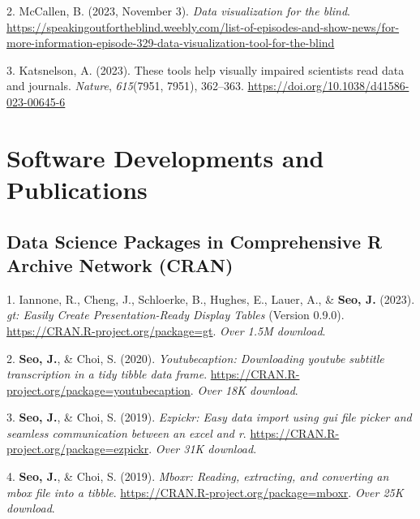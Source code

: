 \documentclass[11pt,a4paper,]{awesome-cv}
\begin{document}
\leavevmode\hypertarget{ref-mccallen2023data}{}%
2. McCallen, B. (2023, November 3). \emph{Data visualization for the
blind}.
\url{https://speakingoutfortheblind.weebly.com/list-of-episodes-and-show-news/for-more-information-episode-329-data-visualization-tool-for-the-blind}

\leavevmode\hypertarget{ref-katsnelsonTheseToolsHelp2023}{}%
3. Katsnelson, A. (2023). These tools help visually impaired scientists
read data and journals. \emph{Nature}, \emph{615}(7951, 7951), 362--363.
\url{https://doi.org/10.1038/d41586-023-00645-6}

\hypertarget{software-developments-and-publications}{%
\section{Software Developments and
Publications}\label{software-developments-and-publications}}

\hypertarget{data-science-packages-in-comprehensive-r-archive-network-cran}{%
\subsection{Data Science Packages in Comprehensive R Archive Network
(CRAN)}\label{data-science-packages-in-comprehensive-r-archive-network-cran}}

\hypertarget{bibliography}{}
\leavevmode\hypertarget{ref-Iannone_gt_Easily_Create}{}%
1. Iannone, R., Cheng, J., Schloerke, B., Hughes, E., Lauer, A., \&
\textbf{Seo, J.} (2023). \emph{gt: Easily Create Presentation-Ready
Display Tables} (Version 0.9.0).
\url{https://CRAN.R-project.org/package=gt}. \emph{Over 1.5M download}.

\leavevmode\hypertarget{ref-R-youtubecaption}{}%
2. \textbf{Seo, J.}, \& Choi, S. (2020). \emph{Youtubecaption:
Downloading youtube subtitle transcription in a tidy tibble data frame}.
\url{https://CRAN.R-project.org/package=youtubecaption}. \emph{Over 18K
download}.

\leavevmode\hypertarget{ref-R-ezpickr}{}%
3. \textbf{Seo, J.}, \& Choi, S. (2019). \emph{Ezpickr: Easy data import
using gui file picker and seamless communication between an excel and
r}. \url{https://CRAN.R-project.org/package=ezpickr}. \emph{Over 31K
download}.

\leavevmode\hypertarget{ref-R-mboxr}{}%
4. \textbf{Seo, J.}, \& Choi, S. (2019). \emph{Mboxr: Reading,
extracting, and converting an mbox file into a tibble}.
\url{https://CRAN.R-project.org/package=mboxr}. \emph{Over 25K
download}.
\end{document}
